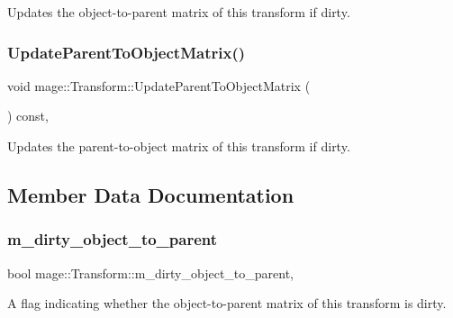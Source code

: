 Updates the object-\/to-\/parent matrix of this transform if dirty. \hypertarget{structmage_1_1_transform_a55829fd7bc87753f6a1c6facfc12ca80}{}\label{structmage_1_1_transform_a55829fd7bc87753f6a1c6facfc12ca80} 
\subsubsection{\texorpdfstring{Update\+Parent\+To\+Object\+Matrix()}{UpdateParentToObjectMatrix()}}
{\footnotesize\ttfamily void mage\+::\+Transform\+::\+Update\+Parent\+To\+Object\+Matrix (\begin{DoxyParamCaption}{ }\end{DoxyParamCaption}) const\hspace{0.3cm}{\ttfamily [private]}, {\ttfamily [noexcept]}}

Updates the parent-\/to-\/object matrix of this transform if dirty. 

\subsection{Member Data Documentation}
\hypertarget{structmage_1_1_transform_a0b6df5bbb04bb38efb3123b4749afc98}{}\label{structmage_1_1_transform_a0b6df5bbb04bb38efb3123b4749afc98} 
\subsubsection{\texorpdfstring{m\+\_\+dirty\+\_\+object\+\_\+to\+\_\+parent}{m\_dirty\_object\_to\_parent}}
{\footnotesize\ttfamily bool mage\+::\+Transform\+::m\+\_\+dirty\+\_\+object\+\_\+to\+\_\+parent\hspace{0.3cm}{\ttfamily [mutable]}, {\ttfamily [private]}}

A flag indicating whether the object-\/to-\/parent matrix of this transform is dirty. \hypertarget{structmage_1_1_transform_a3d415d6a36e2307538c2da461e517a6d}{}\label{structmage_1_1_transform_a3d415d6a36e2307538c2da461e517a6d} 
